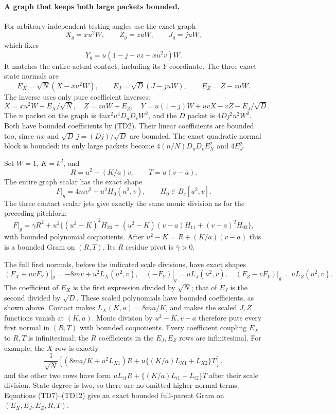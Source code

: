 \paragraph{A graph that keeps both large packets bounded.}
For arbitrary independent testing angles use the exact graph
\[
 X_g=xu^2W,\qquad Z_g=zuW,\qquad J_g=juW,
\]
which fixes
\[
 Y_g=u(1-j-vz+xu^2v)W.                            \tag{TD6}
\]
It matches the entire actual contact, including its $Y$ coordinate.
The three exact state normals are
\[
 E_X=\sqrt N(X-xu^2W),\qquad
 E_J=\sqrt D(J-juW),\qquad E_Z=Z-zuW.             \tag{TD7}
\]
The inverse uses only pure coefficient inverses:
\[
 X=xu^2W+E_X/\sqrt N,\quad Z=zuW+E_Z,\quad
 Y=u(1-j)W+uvX-vZ-E_J/\sqrt D.                   \tag{TD8}
\]
The $n$ packet on the graph is
$4nx^2u^4D_uD_vW^2$, and the $D$ packet is
$4Dj^2u^2W^2$. Both have bounded coefficients by (TD2).
Their linear coefficients are bounded too, since $nx$ and
$\sqrt D\,j=(Dj)/\sqrt D$ are bounded. The exact quadratic
normal block is bounded: its only large packets become
$4(n/N)D_uD_vE_X^2$ and $4E_J^2$.

Set $W=1$, $K=k^2$, and
\[
 R=u^2-(K/a)v,\qquad T=u(v-a).
\]
The entire graph scalar has the exact shape
\[
 F|_g=4mv^2+u^2H_0(u^2,v),\qquad H_0\in B_c[u^2,v].             \tag{TD9}
\]
The three contact scalar jets give exactly the same monic division
as for the preceding pitchfork:
\[
 F|_g=\gamma R^2+u^2\{(u^2-K)^2H_{20}
                   +(u^2-K)(v-a)H_{11}+(v-a)^2H_{02}\},         \tag{TD10}
\]
with bounded polynomial coquotients. After
$u^2-K=R+(K/a)(v-a)$ this is a bounded Gram on $(R,T)$.
Its $R$ residue pivot is $\bar\gamma>0$.

The full first normals, before the indicated scale divisions, have
exact shapes
\[
 (F_X+uvF_Y)|_g=-8mv+u^2L_X(u^2,v),\quad
 (-F_Y)|_g=uL_J(u^2,v),\quad
 (F_Z-vF_Y)|_g=uL_Z(u^2,v).                       \tag{TD11}
\]
The coefficient of $E_X$ is the first expression divided by
$\sqrt N$; that of $E_J$ is the second divided by $\sqrt D$.
These scaled polynomials have bounded coefficients, as shown above.
Contact makes $L_X(K,a)=8ma/K$, and makes the scaled $J,Z$ functions
vanish at $(K,a)$. Monic division by $u^2-K,v-a$ therefore puts
every first normal in $(R,T)$ with bounded coquotients.
Every coefficient coupling $E_X$ to $R,T$ is infinitesimal; the
$R$ coefficients in the $E_J,E_Z$ rows are infinitesimal.
For example, the $X$ row is exactly
\[
\frac1{\sqrt N}\left[
 (8ma/K+u^2L_{X1})R
 +u\{(K/a)L_{X1}+L_{X2}\}T\right],              \tag{TD12}
\]
and the other two rows have form
$uL_{i1}R+\{(K/a)L_{i1}+L_{i2}\}T$ after their scale division.
State degree is two, so there are no omitted higher-normal terms.
Equations (TD7)--(TD12) give an exact bounded full-parent Gram on
$(E_X,E_J,E_Z,R,T)$.

